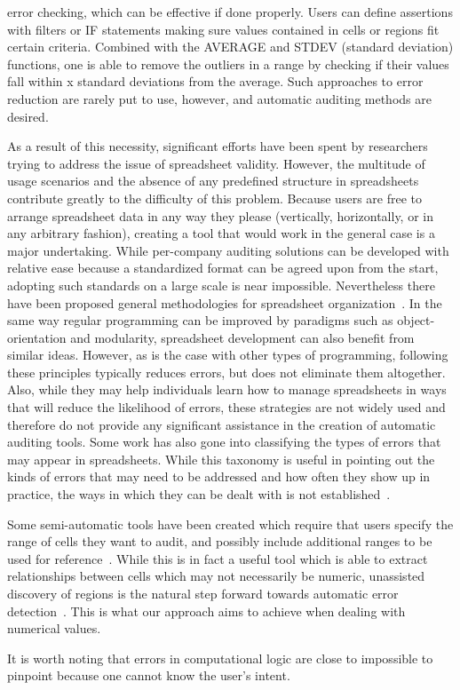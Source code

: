 
error checking, which can be effective if done properly. Users can
define assertions with filters or IF statements making sure values
contained in cells or regions fit certain criteria. Combined with the
AVERAGE and STDEV (standard deviation) functions, one is able to
remove the outliers in a range by checking if their values fall within
x standard deviations from the average. Such approaches to error
reduction are rarely put to use, however, and automatic auditing
methods are desired.

As a result of this necessity, significant efforts have been spent by
researchers trying to address the issue of spreadsheet
validity. However, the multitude of usage scenarios and the absence of
any predefined structure in spreadsheets contribute greatly to the
difficulty of this problem. Because users are free to arrange
spreadsheet data in any way they please (vertically, horizontally, or
in any arbitrary fashion), creating a tool that would work in the
general case is a major undertaking. While per-company auditing
solutions can be developed with relative ease because a standardized
format can be agreed upon from the start, adopting such standards on a
large scale is near impossible. Nevertheless there have been proposed
general methodologies for spreadsheet organization~\cite{panko1998we}. %
 In the same
way regular programming can be improved by paradigms such as
object-orientation and modularity, spreadsheet development can also
benefit from similar ideas. However, as is the case with other types
of programming, following these principles typically reduces errors,
but does not eliminate them altogether. Also, while they may help
individuals learn how to manage spreadsheets in ways that will reduce
the likelihood of errors, these strategies are not widely used and
therefore do not provide any significant assistance in the creation of
automatic auditing tools.  Some work has also gone into classifying
the types of errors that may appear in spreadsheets. While this
taxonomy is useful in pointing out the kinds of errors that may need
to be addressed and how often they show up in practice, the ways in
which they can be dealt with is not established~\cite{rajalingham2005revised}. %

Some semi-automatic tools have been created which require that users
specify the range of cells they want to audit, and possibly include
additional ranges to be used for reference~\cite{FIXME}. %
 While this is in fact
a useful tool which is able to extract relationships between cells
which may not necessarily be numeric, unassisted discovery of regions
is the natural step forward towards automatic error detection~\cite{fisher2006scaling}. %
This is what our approach aims to achieve when dealing with
numerical values.

It is worth noting that errors in computational logic are close to
impossible to pinpoint because one cannot know the user's intent.
